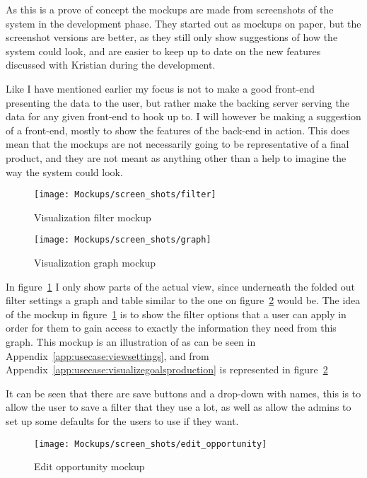 As this is a prove of concept the mockups are made from screenshots of the
system in the development phase. They started out as mockups on paper, but the
screenshot versions are better, as they still only show suggestions of how the
system could look, and are easier to keep up to date on the new features
discussed with Kristian during the development.

Like I have mentioned earlier my focus is not to make a good front-end presenting
the data to the user, but rather make the backing server serving the data for
any given front-end to hook up to. I will however be making a suggestion of a
front-end, mostly to show the features of the back-end in action. This does
mean that the mockups are not necessarily going to be representative of
a final product, and they are not meant as anything other than a help to
imagine the way the system could look. 

\begin{figure}[!htb]
  \centering
  \texttt{[image: Mockups/screen\_shots/filter]}
  \caption{Visualization filter mockup}
\label{fig:VisualizationFilter}
\end{figure}

\begin{figure}[!htb]
  \centering
  \texttt{[image: Mockups/screen\_shots/graph]}
  \caption{Visualization graph mockup}
\label{fig:VisualizationView}
\end{figure}

In figure~\ref{fig:VisualizationFilter} I only show parts  of the actual view,
since underneath the folded out filter settings a graph and table similar to the
one on figure~\ref{fig:VisualizationView} would be. The idea of the mockup in
figure~\ref{fig:VisualizationFilter} is to show the filter options that a user
can apply in order for them to gain access to exactly the information they need
from this graph. This mockup is an illustration of
 as can be seen in
Appendix~\ref{app:usecase:viewsettings}, and
 from
Appendix~\ref{app:usecase:visualizegoalsproduction} is represented in figure~\ref{fig:VisualizationView}

It can be seen that there are save buttons and a drop-down with names, this is to
allow the user to save a filter that they use a lot, as well as allow the admins
to set up some defaults for the users to use if they want.

\begin{figure}[!htb]
  \centering
  \texttt{[image: Mockups/screen\_shots/edit\_opportunity]}
  \caption{Edit opportunity mockup}
\label{fig:OpportunityView}
\end{figure}

